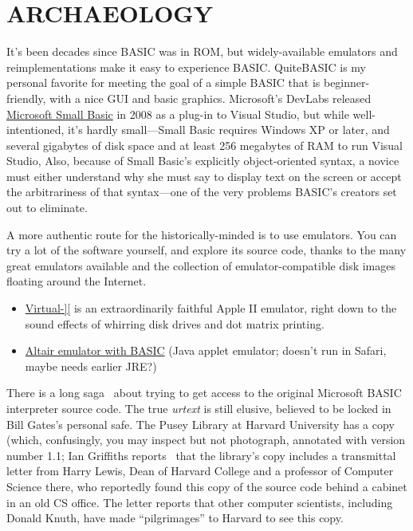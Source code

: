 
\section{ARCHAEOLOGY}


It's been decades since BASIC was in ROM, but widely-available emulators
and reimplementations make it easy to experience BASIC.
QuiteBASIC is my personal favorite for meeting the goal of a simple
BASIC that is beginner-friendly, with a nice GUI and basic graphics.
Microsoft's DevLabs released \href{http://smallbasic.com}{Microsoft
Small Basic} in 2008 as a plug-in to Visual Studio, but while
well-intentioned, it's hardly small---Small Basic requires Windows XP or
later, and several gigabytes of disk space and at least 256 megabytes of
RAM to run Visual Studio,
Also, because of Small Basic's explicitly object-oriented syntax, a
novice must either understand why she must say
 to display text on the screen or
accept the arbitrariness of that syntax---one of the very problems
BASIC's creators set out to eliminate.

A more authentic route for the historically-minded is to use emulators.
You can try a lot of the software yourself, and explore
its source code, thanks to the many great emulators available and the
collection of emulator-compatible disk images floating around the Internet.

\begin{itemize}

\item \href{http://virtualii.com}{Virtual-][} is an extraordinarily
  faithful Apple II emulator, right down to the sound effects of
  whirring disk drives and dot matrix printing.

\item \href{http://web.archive.org/web/20011211231432/http://www.rjh.org.uk/altair/4k/em/altem.htm}{Altair emulator with BASIC} (Java applet emulator; doesn't run in Safari,
maybe needs earlier JRE?)

\end{itemize}


There is a long saga~\cite{raiders} about trying to get access to the original
Microsoft BASIC interpreter source code.
The true \emph{urtext\/} is still elusive, believed to be locked in Bill Gates's
personal safe.
The Pusey Library at Harvard University has a copy (which, confusingly, you may
inspect but not photograph, annotated with version number 1.1;
Ian Griffiths reports~\cite{ians_trip} that the library's copy includes
a transmittal letter from 
Harry Lewis, Dean of Harvard College and a professor of Computer
Science there, who reportedly found this copy of the source code behind
a cabinet in an old CS office.
The letter reports that other computer scientists, including Donald
Knuth, have made ``pilgrimages'' to Harvard to see this copy.

